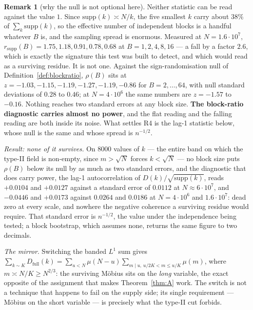 \documentclass[11pt,a4paper]{article}
\theoremstyle{plain}
\theoremstyle{definition}
\newtheorem{remark}[theorem]{Remark}
\begin{document}
\begin{remark}[why the null is not optional here]
Neither statistic can be read against the value $1$. Since
$\mathrm{supp}(k)\asymp N/k$, the five smallest $k$ carry about $38\%$
of $\sum_k\mathrm{supp}(k)$, so the effective number of independent
blocks is a handful whatever $B$ is, and the sampling spread is
enormous. Measured at $N=1.6\cdot10^7$,
$r_{\mathrm{supp}}(B) = 1.75, 1.18, 0.91, 0.78, 0.68$ at
$B=1,2,4,8,16$ --- a fall by a factor $2.6$, which is exactly the
signature this test was built to detect, and which would read as a
surviving residue. It is not one. Against the sign-randomisation null
of Definition~\ref{def:blockratio}, $\rho(B)$ sits at
$z = -1.03, -1.15, -1.19, -1.27, -1.19, -0.86$ for
$B = 2,\dots,64$, with null standard deviations of $0.28$ to $0.46$;
at $N = 4\cdot10^6$ the same numbers are $z = -1.57$ to $-0.16$.
Nothing reaches two standard errors at any block size. \textbf{The
block-ratio diagnostic carries almost no power}, and the flat reading
and the falling reading are both inside its noise. What settles R4 is
the lag-1 statistic below, whose null is the same and whose spread is
$n^{-1/2}$.
\end{remark}

\emph{Result: none of it survives.} On $8000$ values of $k$ --- the
entire band on which the type-II field is non-empty, since
$m > \sqrt N$ forces $k < \sqrt N$ --- no block size puts $\rho(B)$
below its null by as much as two standard errors, and the diagnostic
that does carry power, the lag-1 autocorrelation of
$D(k)/\sqrt{\mathrm{supp}(k)}$, reads $+0.0104$ and $+0.0127$ against
a standard error of $0.0112$ at $N\approx6\cdot10^7$, and $-0.0446$
and $+0.0173$ against $0.0264$ and $0.0186$ at $N=4\cdot10^6$ and
$1.6\cdot10^7$: dead zero at every scale, and nowhere the negative
coherence a surviving residue would require. That standard error is
$n^{-1/2}$, the value under the independence being tested; a block
bootstrap, which assumes none, returns the same figure to two
decimals.

\emph{The mirror.} Switching the banded $L^1$ sum gives
$\sum_{k\sim K}D_{\text{full}}(k)
 = \sum_{u<N}\mu(N-u)\sum_{m\mid u,\ u/2K<m\le u/K}\mu(m)$, where
$m \asymp N/K \ge N^{2/3}$: the surviving M\"obius sits on the
\emph{long} variable, the exact opposite of the assignment that makes
Theorem~\ref{thm:A} work. The switch is not a technique that happens
to fail on the supply side; its single requirement --- M\"obius on the
short variable --- is precisely what the type-II cut forbids.
\end{document}
